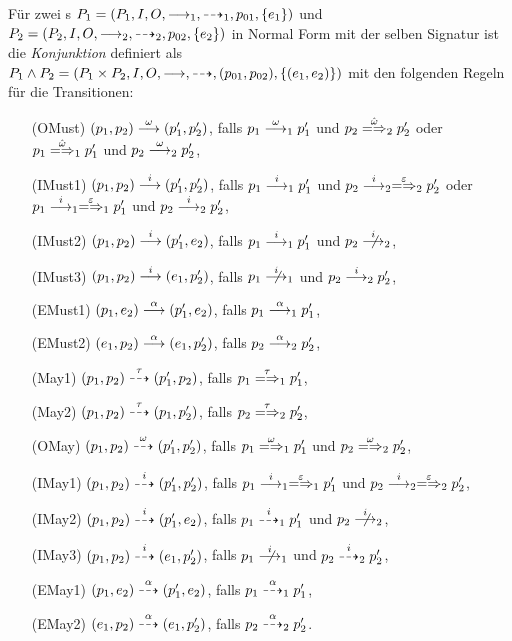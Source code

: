 \begin{Def}[Konjunktion]
  \label{ConjDef}
  Für zwei \MEIO{}s $P_1 = (P_1,I,O,\must _1,\may _1,p_{01},\{e_1\})$ und $P_2
  = (P_2,I,O,\must _2,\may _2,p_{02},\{e_2\})$ in Normal Form mit der selben
  Signatur ist die \emph{Konjunktion} definiert als $P_1\land P_2 =
  (P_1\times P_2, I, O, \must, \may ,(p_{01},p_{02}),\{(e_1,e_2)\})$ mit den
  folgenden Regeln für die Transitionen:
  \begin{itemize}
    \item[(OMust)] $(p_1,p_2) \must[\omega] (p'_1,p'_2)$, falls
      $p_1 \must[\omega]_1 p'_1$ und $p_2 \weakmay[\hat{\omega}]_2 p'_2$ oder
      $p_1 \weakmay[\hat{\omega}]_1 p'_1$ und $p_2 \must[\omega]_2 p'_2$,
    \item[(IMust1)] $(p_1,p_2) \must[i] (p'_1,p'_2)$, falls $p_1 \must[i]_1
      p'_1$ und $p_2 \must[i]_2 \weakmay[\varepsilon]_2 p'_2$ oder $p_1
      \must[i]_1 \weakmay[\varepsilon]_1 p'_1$ und $p_2 \must[i]_2 p'_2$,
    \item[(IMust2)] $(p_1,p_2) \must[i] (p'_1,e_2)$, falls $p_1 \must[i]_1
      p'_1$ und $p_2 \nmust[i]_2$,
    \item[(IMust3)] $(p_1,p_2) \must[i] (e_1,p'_2)$, falls $p_1 \nmust[i]_1$
      und $p_2 \must[i]_2 p'_2$,
    \item[(EMust1)] $(p_1,e_2) \must[\alpha] (p'_1,e_2)$, falls $p_1
      \must[\alpha]_1 p'_1$,
    \item[(EMust2)] $(e_1,p_2) \must[\alpha] (e_1,p'_2)$, falls $p_2
      \must[\alpha]_2 p'_2$,
    \item[(May1)] $(p_1,p_2) \may[\tau] (p'_1,p_2)$, falls $p_1
      \weakmay[\tau]_1 p'_1$,
    \item[(May2)] $(p_1,p_2) \may[\tau] (p_1,p'_2)$, falls $p_2
      \weakmay[\tau]_2 p'_2$,
    \item[(OMay)] $(p_1,p_2) \may[\omega] (p'_1,p'_2)$, falls $p_1
      \weakmay[\omega]_1 p'_1$ und $p_2 \weakmay[\omega]_2 p'_2$,
    \item[(IMay1)] $(p_1,p_2) \may[i] (p'_1,p'_2)$, falls $p_1 \must[i]_1
      \weakmay[\varepsilon]_1 p'_1$ und $p_2 \must[i]_2 \weakmay[\varepsilon]_2
      p'_2$,
    \item[(IMay2)] $(p_1,p_2) \may[i] (p'_1,e_2)$, falls $p_1 \may[i]_1 p'_1$
      und $p_2 \nmust[i]_2$,
    \item[(IMay3)] $(p_1,p_2) \may[i] (e_1,p'_2)$, falls $p_1 \nmust[i]_1$ und
      $p_2 \may[i]_2 p'_2$,
    \item[(EMay1)] $(p_1,e_2) \may[\alpha] (p'_1,e_2)$, falls $p_1
      \may[\alpha]_1 p'_1$,
    \item[(EMay2)] $(e_1,p_2) \may[\alpha] (e_1,p'_2)$, falls $p_2
      \may[\alpha]_2 p'_2$.
  \end{itemize}
\end{Def}

